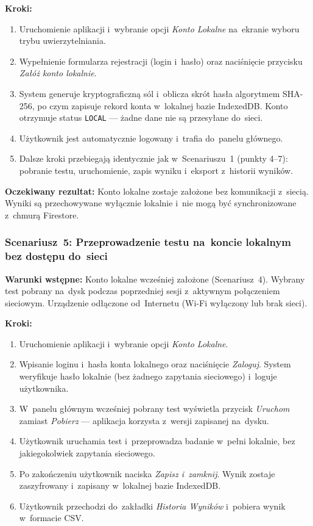 \documentclass[12pt, a4paper, oneside]{report}
\begin{document}
\textbf{Kroki:}
\begin{enumerate}[noitemsep]
	\item Uruchomienie aplikacji i~wybranie opcji \textit{Konto Lokalne} na~ekranie
	      wyboru trybu uwierzytelniania.
	\item Wypełnienie formularza rejestracji (login i~hasło) oraz naciśnięcie przycisku
	      \textit{Załóż konto lokalnie}.
	\item System generuje kryptograficzną sól i~oblicza skrót hasła algorytmem SHA-256,
	      po czym zapisuje rekord konta w~lokalnej bazie IndexedDB. Konto otrzymuje status
	      \texttt{LOCAL} --- żadne dane nie są przesyłane do~sieci.
	\item Użytkownik jest automatycznie logowany i~trafia do~panelu głównego.
	\item Dalsze kroki przebiegają identycznie jak w~Scenariuszu~1 (punkty 4--7):
	      pobranie testu, uruchomienie, zapis wyniku i~eksport z~historii wyników.
\end{enumerate}

\textbf{Oczekiwany rezultat:} Konto lokalne zostaje założone bez komunikacji z~siecią.
Wyniki są przechowywane wyłącznie lokalnie i~nie mogą być synchronizowane z~chmurą Firestore.

\subsubsection*{Scenariusz~5: Przeprowadzenie testu na~koncie lokalnym bez dostępu do~sieci}
\label{scen:5}

\textbf{Warunki wstępne:} Konto lokalne wcześniej założone (Scenariusz~4).
Wybrany test pobrany na~dysk podczas poprzedniej sesji z~aktywnym połączeniem sieciowym.
Urządzenie odłączone od~Internetu (Wi-Fi wyłączony lub brak sieci).

\textbf{Kroki:}
\begin{enumerate}[noitemsep]
	\item Uruchomienie aplikacji i~wybranie opcji \textit{Konto Lokalne}.
	\item Wpisanie loginu i~hasła konta lokalnego oraz naciśnięcie \textit{Zaloguj}.
	      System weryfikuje hasło lokalnie (bez żadnego zapytania sieciowego)
	      i~loguje użytkownika.
	\item W~panelu głównym wcześniej pobrany test wyświetla przycisk \textit{Uruchom}
	      zamiast \textit{Pobierz} --- aplikacja korzysta z~wersji zapisanej na~dysku.
	\item Użytkownik uruchamia test i~przeprowadza badanie w~pełni lokalnie,
	      bez jakiegokolwiek zapytania sieciowego.
	\item Po zakończeniu użytkownik naciska \textit{Zapisz i~zamknij}. Wynik zostaje
	      zaszyfrowany i~zapisany w~lokalnej bazie IndexedDB.
	\item Użytkownik przechodzi do~zakładki \textit{Historia Wyników} i~pobiera
	      wynik w~formacie CSV.
\end{enumerate}
\end{document}
